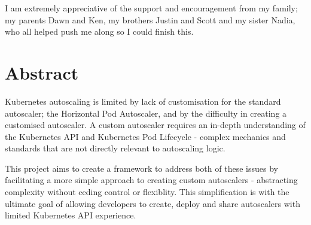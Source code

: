 I am extremely appreciative of the support and encouragement from my family; my
parents Dawn and Ken, my brothers Justin and Scott and my sister Nadia, who all
helped push me along so I could finish this. 

\newpage

\section*{Abstract}

Kubernetes autoscaling is limited by lack of customisation for the standard
autoscaler; the Horizontal Pod Autoscaler, and by the difficulty in creating a
customised autoscaler. A custom autoscaler requires an in-depth understanding of
the Kubernetes API and Kubernetes Pod Lifecycle - complex mechanics and
standards that are not directly relevant to autoscaling logic.

This project aims to create a framework to address both of these issues by
facilitating a more simple approach to creating custom autoscalers - abstracting
complexity without ceding control or flexiblity. This simplification is with the
ultimate goal of allowing developers to create, deploy and share autoscalers
with limited Kubernetes API experience.

\newpage
